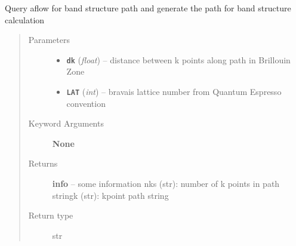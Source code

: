 \documentclass[letterpaper,10pt,english]{sphinxmanual}
\begin{document}
\begin{fulllineitems}
\label{prep:prep.bandsAflow}
Query aflow for band structure path and generate the path for band structure calculation
\begin{quote}\begin{description}
\item[{Parameters}] \leavevmode\begin{itemize}
\item {} 
\textbf{\texttt{dk}} (\emph{float}) -- distance between k points along path in Brillouin Zone

\item {} 
\textbf{\texttt{LAT}} (\emph{int}) -- bravais lattice number from Quantum Espresso convention

\end{itemize}

\item[{Keyword Arguments}] \leavevmode
\textbf{None}

\item[{Returns}] \leavevmode
\textbf{info} --
some information
nks (str): number of k points in path
stringk (str): kpoint path string

\item[{Return type}] \leavevmode
str

\end{description}\end{quote}

\end{fulllineitems}


\begin{fulllineitems}
\label{prep:prep.build_calcs}
\end{fulllineitems}

\end{document}
